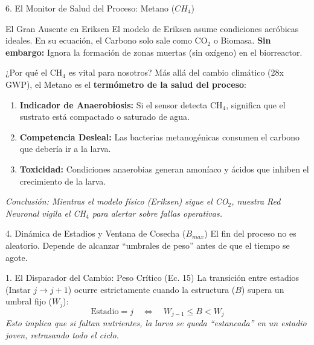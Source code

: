\documentclass[aspectratio=169, 10pt]{beamer}
\begin{document}
\begin{frame}{6. El Monitor de Salud del Proceso: Metano ($CH_4$)}

    \begin{alertblock}{El Gran Ausente en Eriksen}
        El modelo de Eriksen asume condiciones aeróbicas ideales. En su ecuación, el Carbono solo sale como CO$_2$ o Biomasa.
        \vspace{0.1cm}
        \textbf{Sin embargo:} Ignora la formación de zonas muertas (sin oxígeno) en el biorreactor.
    \end{alertblock}

    \vspace{0.3cm}

    \begin{block}{¿Por qué el CH$_4$ es vital para nosotros?}
        Más allá del cambio climático (28x GWP), el Metano es el \textbf{termómetro de la salud del proceso}:
    \end{block}

    \vspace{0.2cm}
    \small
    \begin{enumerate}
        \item \textbf{Indicador de Anaerobiosis:} Si el sensor detecta CH$_4$, significa que el sustrato está compactado o saturado de agua.
        \item \textbf{Competencia Desleal:} Las bacterias metanogénicas consumen el carbono que debería ir a la larva.
        \item \textbf{Toxicidad:} Condiciones anaerobias generan amoníaco y ácidos que inhiben el crecimiento de la larva.
    \end{enumerate}

    \vspace{0.2cm}
    \centering
    \textit{Conclusión: Mientras el modelo físico (Eriksen) sigue el CO$_2$, nuestra Red Neuronal vigila el CH$_4$ para alertar sobre fallas operativas.}
\end{frame}
\begin{frame}{4. Dinámica de Estadios y Ventana de Cosecha ($B_{max}$)}
    El fin del proceso no es aleatorio. Depende de alcanzar ``umbrales de peso'' antes de que el tiempo se agote.

    \begin{block}{1. El Disparador del Cambio: Peso Crítico (Ec. 15)}
        La transición entre estadios (Instar $j \to j+1$) ocurre estrictamente cuando la estructura ($B$) supera un umbral fijo ($W_j$):
        $$ \text{Estadio} = j \quad \iff \quad W_{j-1} \le B < W_j $$
        \footnotesize \textit{Esto implica que si faltan nutrientes, la larva se queda ``estancada'' en un estadio joven, retrasando todo el ciclo.}
    \end{block}
\end{frame}
\end{document}
